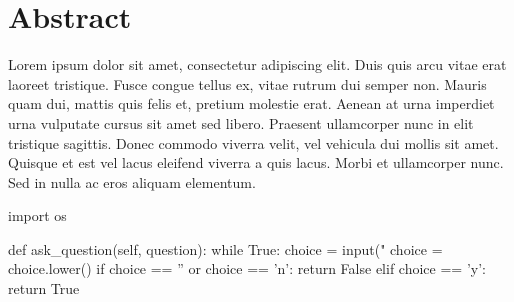 
\chapter*{Abstract}

 Lorem ipsum dolor sit amet, consectetur adipiscing elit. Duis quis arcu vitae erat laoreet tristique. Fusce congue tellus ex, vitae rutrum dui semper non. Mauris quam dui, mattis quis felis et, pretium molestie erat. Aenean at urna imperdiet urna vulputate cursus sit amet sed libero. Praesent ullamcorper nunc in elit tristique sagittis. Donec commodo viverra velit, vel vehicula dui mollis sit amet. Quisque et est vel lacus eleifend viverra a quis lacus. Morbi et ullamcorper nunc. Sed in nulla ac eros aliquam elementum.

\begin{pycode}
import os

def ask_question(self, question):
    while True:
        choice = input("%
        choice = choice.lower()
        if choice == '' or choice == 'n':
            return False
        elif choice == 'y':
            return True
\end{pycode}
